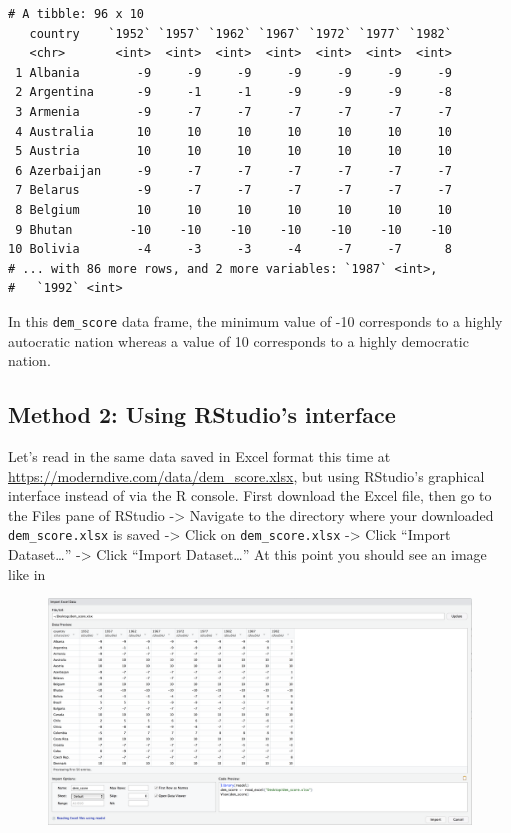 \documentclass[12pt,]{krantz}
\begin{document}
\begin{verbatim}
# A tibble: 96 x 10
   country    `1952` `1957` `1962` `1967` `1972` `1977` `1982`
   <chr>       <int>  <int>  <int>  <int>  <int>  <int>  <int>
 1 Albania        -9     -9     -9     -9     -9     -9     -9
 2 Argentina      -9     -1     -1     -9     -9     -9     -8
 3 Armenia        -9     -7     -7     -7     -7     -7     -7
 4 Australia      10     10     10     10     10     10     10
 5 Austria        10     10     10     10     10     10     10
 6 Azerbaijan     -9     -7     -7     -7     -7     -7     -7
 7 Belarus        -9     -7     -7     -7     -7     -7     -7
 8 Belgium        10     10     10     10     10     10     10
 9 Bhutan        -10    -10    -10    -10    -10    -10    -10
10 Bolivia        -4     -3     -3     -4     -7     -7      8
# ... with 86 more rows, and 2 more variables: `1987` <int>,
#   `1992` <int>
\end{verbatim}

In this \texttt{dem\_score} data frame, the minimum value of -10
corresponds to a highly autocratic nation whereas a value of 10
corresponds to a highly democratic nation.

\subsection{Method 2: Using RStudio's
interface}\label{method-2-using-rstudios-interface}

Let's read in the same data saved in Excel format this time at
\url{https://moderndive.com/data/dem_score.xlsx}, but using RStudio's
graphical interface instead of via the R console. First download the
Excel file, then go to the Files pane of RStudio -\textgreater{}
Navigate to the directory where your downloaded \texttt{dem\_score.xlsx}
is saved -\textgreater{} Click on \texttt{dem\_score.xlsx}
-\textgreater{} Click ``Import Dataset\ldots{}'' -\textgreater{} Click
``Import Dataset\ldots{}'' At this point you should see an image like in

\begin{figure}
\centering
\includegraphics{images/read_excel.png}
\caption{}
\end{figure}
\end{document}
